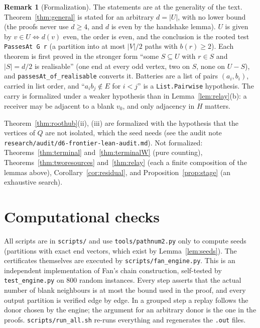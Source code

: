 \documentclass[11pt]{amsart}
\theoremstyle{definition}
\newtheorem{remark}[theorem]{Remark}
\begin{document}
\begin{remark}[Formalization]
The statements are at the generality of the text. Theorem~\ref{thm:general} is stated for an
arbitrary $d=|U|$, with no lower bound (the proofs never use $d\ge4$, and $d$ is even by the
handshake lemma). $U$ is given by $v\in U\iff d(v)$ even, the order is even, and the conclusion
is the rooted test \texttt{PassesAt G r} (a partition into at most $|V|/2$ paths with $b(r)\ge2$).
Each theorem is first proved in the stronger form ``some $S\subseteq U$ with $r\in S$ and
$|S|=d/2$ is realisable'' (one end at every odd vertex, two on $S$, none on $U-S$), and
\texttt{passesAt\_of\_realisable} converts it. Batteries are a list of pairs $(a_i,b_i)$, carried
in list order, and ``$a_ib_j\notin E$ for $i<j$'' is a \texttt{List.Pairwise} hypothesis. The
carry is formalized under a weaker hypothesis than in Lemma~\ref{lem:relay}(b): a receiver may be
adjacent to a blank $v_0$, and only adjacency in $H$ matters.

Theorem~\ref{thm:roothub}(ii), (iii) are formalized with the hypothesis that the vertices of $Q$
are not isolated, which the seed needs (see the audit note
\texttt{research/audit/d6-frontier-lean-audit.md}).
Not formalized: Theorems~\ref{thm:terminal} and~\ref{thm:terminalW} (pure counting),
Theorems~\ref{thm:tworesources} and~\ref{thm:relay}
(each a finite composition of the lemmas above), Corollary~\ref{cor:residual}, and
Proposition~\ref{prop:stage} (an exhaustive search).
\end{remark}

\fussy
\section*{Computational checks}

All scripts are in \texttt{scripts/} and use \texttt{tools/pathnum2.py} only to compute seeds
(partitions with exact end vectors, which exist by Lemma~\ref{lem:seeds}). The certificates
themselves are executed by \texttt{scripts/fan\_engine.py}. This is an independent implementation
of Fan's chain construction, self-tested by \texttt{test\_engine.py} on $800$ random instances.
Every step asserts that the actual number of blank neighbours is at most the bound used in the
proof, and every output partition is verified edge by edge. In a grouped step a replay follows the
donor chosen by the engine; the argument for an arbitrary donor is the one in the proofs.
\texttt{scripts/run\_all.sh}
re-runs everything and regenerates the \texttt{.out} files.
\end{document}
